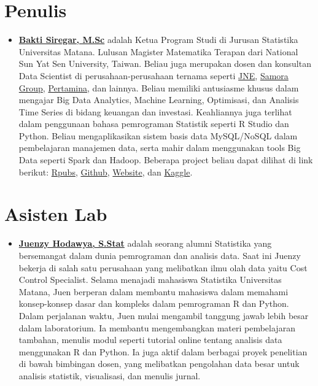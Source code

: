 \documentclass[
]{book}
\providecommand{\tightlist}{%
  \setlength{\itemsep}{0pt}\setlength{\parskip}{0pt}}
\begin{document}
\hypertarget{penulis}{%
\section*{Penulis}\label{penulis}}

\begin{itemize}
\tightlist
\item
  \textbf{\href{https://www.linkedin.com/in/dsciencelabs/}{Bakti Siregar, M.Sc}} adalah Ketua Program Studi di Jurusan Statistika Universitas Matana. Lulusan Magister Matematika Terapan dari National Sun Yat Sen University, Taiwan. Beliau juga merupakan dosen dan konsultan Data Scientist di perusahaan-perusahaan ternama seperti \href{https://www.jne.co.id/id/beranda}{JNE}, \href{https://www.samoragroup.co.id/home/en}{Samora Group}, \href{https://www.pertamina.com/}{Pertamina}, dan lainnya. Beliau memiliki antusiasme khusus dalam mengajar Big Data Analytics, Machine Learning, Optimisasi, dan Analisis Time Series di bidang keuangan dan investasi. Keahliannya juga terlihat dalam penggunaan bahasa pemrograman Statistik seperti R Studio dan Python. Beliau mengaplikasikan sistem basis data MySQL/NoSQL dalam pembelajaran manajemen data, serta mahir dalam menggunakan tools Big Data seperti Spark dan Hadoop. Beberapa project beliau dapat dilihat di link berikut: \href{https://rpubs.com/dsciencelabs}{Rpubs}, \href{https://github.com/dsciencelabs}{Github}, \href{https://dsciencelabs.github.io/web/index.html}{Website}, dan \href{https://www.kaggle.com/baktisiregar/code}{Kaggle}.
\end{itemize}

\hypertarget{asisten-lab}{%
\section*{Asisten Lab}\label{asisten-lab}}

\begin{itemize}
\tightlist
\item
  \textbf{\href{https://www.linkedin.com/in/juenzy-hodawya/}{Juenzy Hodawya, S.Stat}} adalah seorang alumni Statistika yang bersemangat dalam dunia pemrograman dan analisis data. Saat ini Juenzy bekerja di salah satu perusahaan yang melibatkan ilmu olah data yaitu Cost Control Specialist. Selama menajadi mahasiswa Statistika Universitas Matana, Juen berperan dalam membantu mahasiswa dalam memahami konsep-konsep dasar dan kompleks dalam pemrograman R dan Python. Dalam perjalanan waktu, Juen mulai mengambil tanggung jawab lebih besar dalam laboratorium. Ia membantu mengembangkan materi pembelajaran tambahan, menulis modul seperti tutorial online tentang analisis data menggunakan R dan Python. Ia juga aktif dalam berbagai proyek penelitian di bawah bimbingan dosen, yang melibatkan pengolahan data besar untuk analisis statistik, visualisasi, dan menulis jurnal.
\end{itemize}
\end{document}

